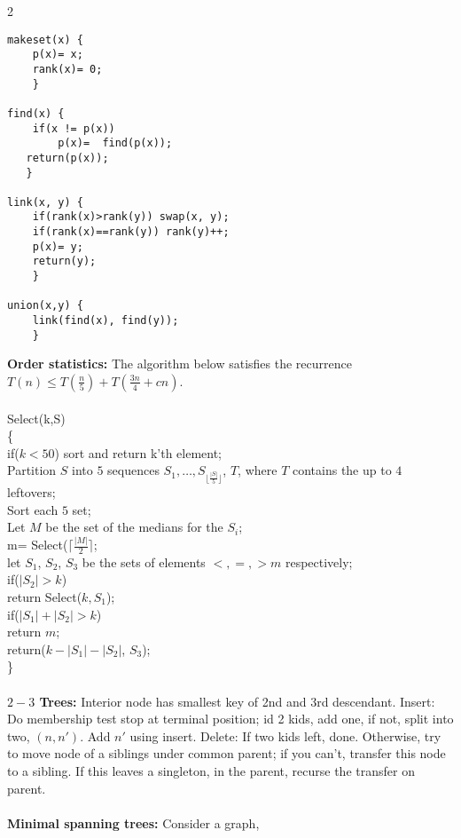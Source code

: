 \begin{multicols} {2} {
\begin{verbatim}
makeset(x) {
    p(x)= x;
    rank(x)= 0;
    } 

find(x) {
    if(x != p(x))
        p(x)=  find(p(x)); 
   return(p(x));
   }

link(x, y) {
    if(rank(x)>rank(y)) swap(x, y);
    if(rank(x)==rank(y)) rank(y)++;
    p(x)= y;
    return(y);
    }

union(x,y) {
    link(find(x), find(y));
    }
\end{verbatim}
}
\end{multicols}

{\bf Order statistics:} The algorithm below satisfies the recurrence 
$T(n) \leq T({\frac n 5}) + T({\frac {3n} 4} + cn)$.
\\
\\
Select(k,S) \\
\{\\
\jt if($k<50$)
\jt \jt sort and return k'th element;\\
\jt Partition $S$ into $5$ sequences $S_1, \ldots , S_{\lfloor {\frac{|S|} 5} \rfloor}$, $T$,
where $T$ contains the up to $4$ leftovers;\\
\jt Sort each $5$ set;\\
\jt Let $M$ be the set of the medians for the $S_i$;\\
\jt m= Select($\lceil {\frac {|M|} 2} \rceil$;\\
\jt let $S_1$, $S_2$, $S_3$ be the sets of elements $<, =, > m$ respectively;\\
\jt if($|S_2|>k$)\\
\jt \jt return Select($k, S_1$);\\
\jt if($|S_1|+|S_2|>k$) \\
\jt \jt return $m$;\\
\jt return($k-|S_1|-|S_2|$, $S_3$);\\
\}
\\
\\
{\bf $2-3$ Trees:} Interior node has smallest key of 2nd and 3rd descendant.
Insert: Do membership test stop at terminal position; id 2 kids, add one, if
not, split into two, $(n, n')$.  Add $n'$ using insert.  
Delete: If two kids left, done.
Otherwise, try to move node of a siblings under common parent; if you can't,
transfer this node to a sibling.  If this leaves a singleton, in the parent,
recurse the transfer on parent.
\\
\\
{\bf Minimal spanning trees:}  Consider a graph,
